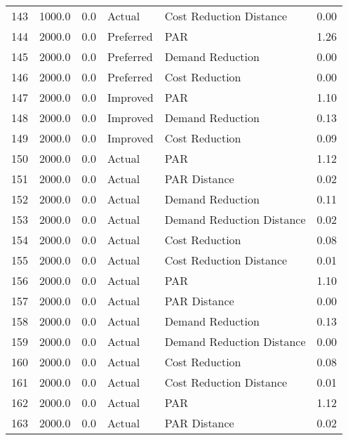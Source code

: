 \begin{longtable}{lrrllr}
143  &       1000.0 &     0.0 &         Actual &    Cost Reduction Distance &   0.00 \\
144  &       2000.0 &     0.0 &      Preferred &                        PAR &   1.26 \\
145  &       2000.0 &     0.0 &      Preferred &           Demand Reduction &   0.00 \\
146  &       2000.0 &     0.0 &      Preferred &             Cost Reduction &   0.00 \\
147  &       2000.0 &     0.0 &       Improved &                        PAR &   1.10 \\
148  &       2000.0 &     0.0 &       Improved &           Demand Reduction &   0.13 \\
149  &       2000.0 &     0.0 &       Improved &             Cost Reduction &   0.09 \\
150  &       2000.0 &     0.0 &         Actual &                        PAR &   1.12 \\
151  &       2000.0 &     0.0 &         Actual &               PAR Distance &   0.02 \\
152  &       2000.0 &     0.0 &         Actual &           Demand Reduction &   0.11 \\
153  &       2000.0 &     0.0 &         Actual &  Demand Reduction Distance &   0.02 \\
154  &       2000.0 &     0.0 &         Actual &             Cost Reduction &   0.08 \\
155  &       2000.0 &     0.0 &         Actual &    Cost Reduction Distance &   0.01 \\
156  &       2000.0 &     0.0 &         Actual &                        PAR &   1.10 \\
157  &       2000.0 &     0.0 &         Actual &               PAR Distance &   0.00 \\
158  &       2000.0 &     0.0 &         Actual &           Demand Reduction &   0.13 \\
159  &       2000.0 &     0.0 &         Actual &  Demand Reduction Distance &   0.00 \\
160  &       2000.0 &     0.0 &         Actual &             Cost Reduction &   0.08 \\
161  &       2000.0 &     0.0 &         Actual &    Cost Reduction Distance &   0.01 \\
162  &       2000.0 &     0.0 &         Actual &                        PAR &   1.12 \\
163  &       2000.0 &     0.0 &         Actual &               PAR Distance &   0.02 \\

\end{longtable}

